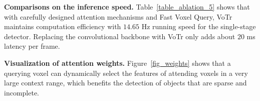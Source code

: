 \documentclass[10pt,twocolumn,letterpaper]{article}
\begin{document}
\textbf{Comparisons on the inference speed.} Table~\ref{table_ablation_5} shows that with carefully designed attention mechanisms and Fast Voxel Query, VoTr maintains computation efficiency with $14.65$ Hz running speed for the single-stage detector. Replacing the convolutional backbone with VoTr only adds about $20$ ms latency per frame. 

\textbf{Visualization of attention weights.} Figure~\ref{fig_weights} shows that a querying voxel can dynamically select the features of attending voxels in a very large context range, which benefits the detection of objects that are sparse and incomplete.



\begin{table}[]
\setlength{\belowcaptionskip}{10pt}
\caption{Effects of attention mechanisms on the KITTI val split. L.A.: Local Attention. D.A.: Dilated Attention.}
\vspace{-2mm}
\label{attention_ablation_table}
\end{table}

\begin{table}[]
\setlength{\belowcaptionskip}{10pt}
\caption{Effects of dropout probabilities on the KITTI \textit{val} split.} \label{table_ablation_2}
\vspace{-2mm}
\end{table}
\end{document}
